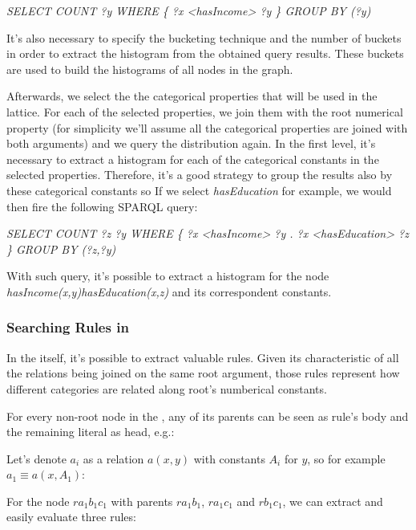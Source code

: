 \begin{center}
 \emph{SELECT COUNT ?y WHERE \{ ?x <hasIncome> ?y \} GROUP BY (?y)}
\end{center}

It's also necessary to specify the bucketing technique and the number of buckets in order to extract the histogram from the obtained query results. These buckets are used to build the histograms of all nodes in the graph.

Afterwards, we select the the categorical properties that will be used in the lattice. For each of the selected properties, we join them with the root numerical property (for simplicity we'll assume all the categorical properties are joined with both  arguments) and we query the distribution again. In the first level, it's necessary to extract a histogram for each of the categorical constants in the selected properties. Therefore, it's a good strategy to group the results also by these categorical constants so If we select \emph{hasEducation} for example, we would then fire the following SPARQL query:

\begin{center}
 \emph{SELECT COUNT ?z ?y WHERE \{ ?x <hasIncome> ?y . ?x <hasEducation> ?z \} GROUP BY (?z,?y)}
\end{center}

With such query, it's possible to extract a histogram for the node \emph{hasIncome(x,y)hasEducation(x,z)} and its correspondent constants. 

\subsubsection{Searching Rules in \graphname}

In the \graphname itself, it's possible to extract valuable rules. Given its characteristic of all the relations being joined on the same root argument, those rules represent how different categories are related along root's numberical constants.

For every non-root node in the \graphname, any of its parents can be seen as rule's body and the remaining literal as head, e.g.:

Let's denote $a_i$ as a relation $a(x,y)$ with constants $A_i$ for $y$, so for example $a_1 \equiv a(x,A_1)$:

For the node $r a_1 b_1 c_1$ with parents $r a_1 b_1$, $r a_1 c_1$ and $r b_1 c_1$, we can extract and easily evaluate three rules:

